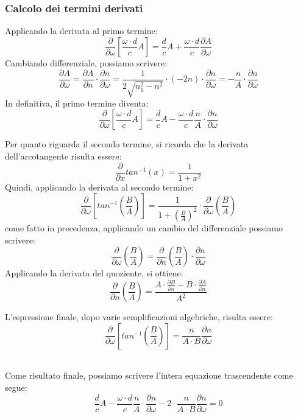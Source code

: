 \subsubsection*{Calcolo dei termini derivati}

\noindent Applicando la derivata al primo termine:
\[
    \frac{\partial}{\partial \omega} \left[\frac{\omega \cdot d}{c} A\right] = \frac{d}{c} A + \frac{\omega \cdot d}{c} \frac{\partial A}{\partial \omega}
\]
\noindent Cambiando differenziale, possiamo scrivere:
\[
    \frac{\partial A}{\partial \omega} = \frac{\partial A}{\partial n} \cdot \frac{\partial n}{\partial \omega} = \frac{1}{2\sqrt{n_1^2 - n^2}} \cdot (-2n) \cdot \frac{\partial n}{\partial \omega} =  -\frac{n}{A} \cdot \frac{\partial n}{\partial \omega}
\]
\noindent In definitiva, il primo termine diventa:
\[
    \frac{\partial}{\partial \omega} \left[\frac{\omega \cdot d}{c} A\right] = \frac{d}{c} A - \frac{\omega \cdot d}{c} \frac{n}{A} \cdot \frac{\partial n}{\partial \omega}
\]  

\newpage
\noindent Per quanto riguarda il secondo termine, si ricorda che la derivata dell'arcotangente risulta essere:
\[
    \frac{\partial}{\partial x} tan^{-1}(x) = \frac{1}{1+x^2}
\]
\noindent Quindi, applicando la derivata al secondo termine:
\[
    \frac{\partial}{\partial \omega} \left[tan^{-1}\left(\frac{B}{A}\right)\right] = \frac{1}{1 + \left(\frac{B}{A}\right)^2} \cdot \frac{\partial}{\partial \omega} \left(\frac{B}{A}\right)
\]
\noindent come fatto in precedenza, applicando un cambio del differenziale possiamo scrivere:
\[
    \frac{\partial}{\partial \omega} \left(\frac{B}{A}\right) = \frac{\partial}{\partial n} \left(\frac{B}{A}\right) \cdot \frac{\partial n}{\partial \omega}
\]
\noindent Applicando la derivata del quoziente, si ottiene:
\[
    \frac{\partial}{\partial n} \left(\frac{B}{A}\right) = \frac{A \cdot \frac{\partial B}{\partial n} - B \cdot \frac{\partial A}{\partial n}}{A^2}
\]

\noindent L'espressione finale, dopo varie semplificazioni algebriche, risulta essere:
\[
    \frac{\partial}{\partial \omega} \left[tan^{-1}\left(\frac{B}{A}\right)\right] = \frac{n}{A \cdot B} \frac{\partial n}{\partial \omega}
\]

\noindent\\ Come risultato finale, possiamo scrivere l'intera equazione trascendente come segue:
\[
    \frac{d}{c} A - \frac{\omega \cdot d}{c} \frac{n}{A} \cdot \frac{\partial n}{\partial \omega} - 2 \cdot \frac{n}{A \cdot B} \frac{\partial n}{\partial \omega} = 0
\]

